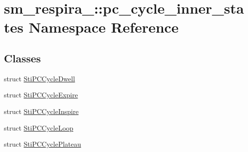 \hypertarget{namespacesm__respira__1_1_1pc__cycle__inner__states}{}\section{sm\+\_\+respira\+\_\+:\+:pc\+\_\+cycle\+\_\+inner\+\_\+states Namespace Reference}
\label{namespacesm__respira__1_1_1pc__cycle__inner__states}
\subsection*{Classes}
\begin{DoxyCompactItemize}
\item 
struct \hyperlink{structsm__respira__1_1_1pc__cycle__inner__states_1_1StiPCCycleDwell}{Sti\+P\+C\+Cycle\+Dwell}
\item 
struct \hyperlink{structsm__respira__1_1_1pc__cycle__inner__states_1_1StiPCCycleExpire}{Sti\+P\+C\+Cycle\+Expire}
\item 
struct \hyperlink{structsm__respira__1_1_1pc__cycle__inner__states_1_1StiPCCycleInspire}{Sti\+P\+C\+Cycle\+Inspire}
\item 
struct \hyperlink{structsm__respira__1_1_1pc__cycle__inner__states_1_1StiPCCycleLoop}{Sti\+P\+C\+Cycle\+Loop}
\item 
struct \hyperlink{structsm__respira__1_1_1pc__cycle__inner__states_1_1StiPCCyclePlateau}{Sti\+P\+C\+Cycle\+Plateau}
\end{DoxyCompactItemize}
